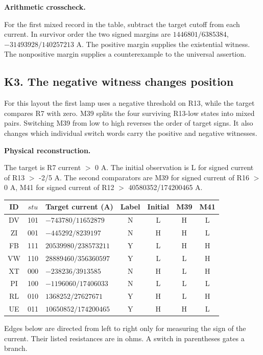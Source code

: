 \documentclass[12pt,letterpaper]{article}
\newcommand{\reading}[2]{\par\smallskip\textsf{\color{accent}\bfseries #1}\enspace #2\par}
\begin{document}
\reading{Arithmetic crosscheck.}{} For the first mixed record in the table, subtract the target cutoff from each current. In survivor order the two signed margins are $1446801/6385384$, $-31493928/140257213$ A. The positive margin supplies the existential witness. The nonpositive margin supplies a counterexample to the universal assertion.

\clearpage\subsection*{K3. The negative witness changes position}

For this layout the first lamp uses a negative threshold on R13, while the target compares R7 with zero. M39 splits the four surviving R13-low states into mixed pairs. Switching M39 from low to high reverses the order of target signs. It also changes which individual switch words carry the positive and negative witnesses.

\reading{Physical reconstruction.}{} The target is R7 current $>$ $0$ A. The initial observation is L for signed current of R13 $>$ -2/5 A. The second comparators are M39 for signed current of R16 $>$ 0 A, M41 for signed current of R12 $>$ 40580352/174200465 A.

\begin{center}{\small\setlength{\tabcolsep}{4pt}\begin{tabularx}{\linewidth}{@{}ccYcccc@{}}\toprule
ID & $stu$ & Target current (A) & Label & Initial & M39 & M41\\\midrule
DV & 101 & $-743780/11652879$ & N & L & H & L\\
ZI & 001 & $-445292/8239197$ & N & H & H & L\\
FB & 111 & $20539980/238573211$ & Y & L & H & H\\
VW & 110 & $28889460/356360597$ & Y & L & L & H\\
XT & 000 & $-238236/3913585$ & N & H & L & H\\
PI & 100 & $-1196060/17406033$ & N & L & L & L\\
RL & 010 & $1368252/27627671$ & Y & H & L & H\\
UE & 011 & $10650852/174200465$ & Y & H & H & L\\
\bottomrule\end{tabularx}}\end{center}

Edges below are directed from left to right only for measuring the sign of the current. Their listed resistances are in ohms. A switch in parentheses gates a branch.
\end{document}
